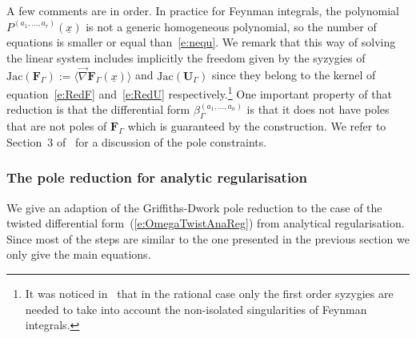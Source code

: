 \documentclass[a4paper,12pt]{article}
\numberwithin{equation}{section}
\numberwithin{figure}{section}
\begin{document}
A few comments are in order. In practice for Feynman integrals,   the polynomial $ P^{(a_1,\dots,a_r)}(\underline x)$ is not a generic
homogeneous polynomial, so the number of equations is smaller or equal than~\eqref{e:nequ}.
%
We remark that this way of solving the linear system includes implicitly the
freedom given by the syzygies of $\textrm{Jac}(\textbf{F}_\Gamma)
 :=\langle \vec\nabla \textbf{F}_\Gamma(\underline x)\rangle$ and
$\textrm{Jac}(\textbf{U}_\Gamma)$ since they belong to
the kernel of equation~\eqref{e:RedF} and~\eqref{e:RedU}
respectively.\footnote{It was noticed in~\cite{Lairez:2022zkj} that in
  the rational case only the first order syzygies are needed to take
  into account the non-isolated singularities of Feynman integrals.}
%
%
%
One important property of that reduction is that the differential form $\beta_\Gamma^{(a_1,\dots,a_n)}$ is that it
does not have poles that are not poles of $\textbf{F}_\Gamma$ which is
guaranteed by the construction. We refer
to Section~3 of~\cite{Lairez:2022zkj} for a discussion of the pole constraints.
%
%
  \subsubsection{The pole reduction for analytic
    regularisation}\label{sec:PoleRedAn}
We give an adaption of the Griffiths-Dwork pole reduction to the case
of the twisted differential form~(\ref{e:OmegaTwistAnaReg})  from
analytical regularisation. Since most of the steps are similar to the
one presented in the previous section we only give the main equations.
\end{document}
